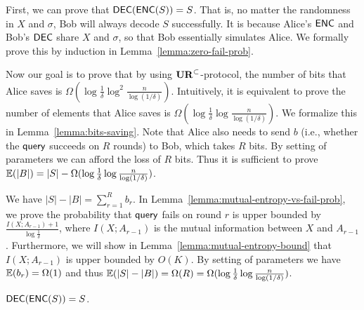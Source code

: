 First, we can prove that $\textsf{DEC}(\textsf{ENC}(S))=S$. 
That is, no matter the randomness in $X$ and $\sigma$, Bob will always decode $S$ successfully. 
It is because Alice's $\textsf{ENC}$ and Bob's $\textsf{DEC}$ share $X$ and $\sigma$, so that Bob essentially simulates Alice. 
We formally prove this by induction in Lemma~\ref{lemma:zero-fail-prob}. 

Now our goal is to prove that by using $\mathbf{UR}^\subset$-protocol, the number of bits that Alice saves is $\Omega(\log \frac{1}{\delta}\log^2 \frac{n}{\log (1/\delta)} )$. 
Intuitively, it is equivalent to prove the number of elements that Alice saves is $\Omega(\log \frac{1}{\delta}\log \frac{n}{\log (1/\delta)} )$.
We formalize this in Lemma~\ref{lemma:bits-saving}. 
Note that Alice also needs to send $b$ (i.e., whether the $\mathsf{query}$ succeeds on $R$ rounds) to Bob, which takes $R$ bits. 
By setting of parameters we can afford the loss of $R$ bits. 
Thus it is sufficient to prove $\operatorname*{\mathbb{E}}(|B|)=|S|-\Omega(\log \frac{1}{\delta}\log \frac{n}{\log (1/\delta)})$. 

We have $|S|-|B|=\sum_{r=1}^{R}b_r$. 
In Lemma~\ref{lemma:mutual-entropy-vs-fail-prob}, we prove the probability that $\mathsf{query}$ fails on round $r$ is upper bounded by $\frac{I(X;A_{r-1})+1}{\log \frac{1}{\delta}}$, where $I(X;A_{r-1})$ is the mutual information between $X$ and $A_{r-1}$. 
Furthermore, we will show in Lemma~\ref{lemma:mutual-entropy-bound} that $I(X;A_{r-1})$ is upper bounded by $O(K)$.
By setting of parameters we have $\operatorname*{\mathbb{E}}(b_r)=\Omega(1)$ and thus $\operatorname*{\mathbb{E}}(|S|-|B|)=\Omega(R)=\Omega(\log \frac{1}{\delta}\log \frac{n}{\log (1/\delta)})$.
 
\begin{lemma}\label{lemma:zero-fail-prob}
  $\textsf{DEC}(\textsf{ENC}(S))=S$.
\end{lemma}

